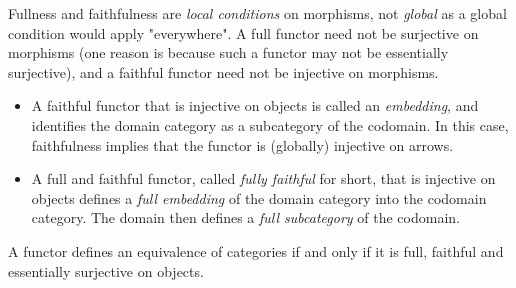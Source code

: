 \vspace*{0.1in}

\begin{remark}
Fullness and faithfulness are \emph{local conditions} on morphisms, not \emph{global} as a global condition would apply "everywhere". A full functor need not be surjective on morphisms (one reason is because such a functor may not be essentially surjective), and a faithful functor need not be injective on morphisms.
\begin{itemize}
\item A faithful functor that is injective on objects is called an \emph{embedding}, and identifies the domain category as a subcategory of the codomain. In this case, faithfulness implies that the functor is (globally) injective on arrows.
\item A full and faithful functor, called \emph{fully faithful} for short, that is injective on objects defines a \emph{full embedding} of the domain category into the codomain category. The domain then defines a \emph{full subcategory} of the codomain.
\end{itemize}
\end{remark}

\vspace*{0.1in}

\begin{theorem}\label{cateq}
A functor defines an equivalence of categories if and only if it is full, faithful and essentially surjective on objects.
\end{theorem}

